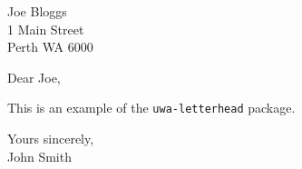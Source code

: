 \documentclass[a4paper,11pt]{article}
\author{John Smith}
\begin{document}
Joe Bloggs \\
1 Main Street \\
Perth WA 6000

\vspace{2\baselineskip}

Dear Joe,

This is an example of the \texttt{uwa-letterhead} package.

Yours sincerely, \\
John Smith
\end{document}

